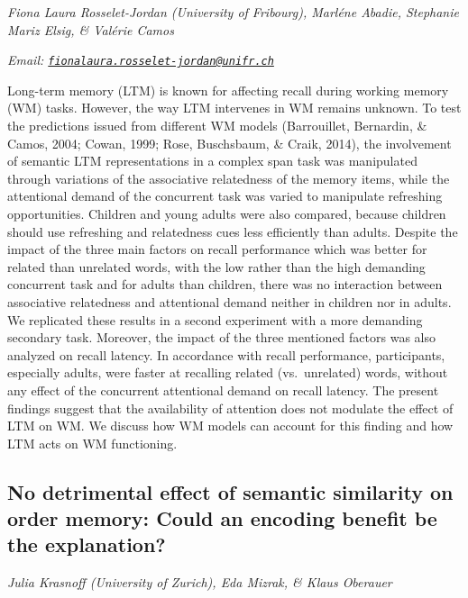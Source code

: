 \documentclass[12pt,]{book}
\begin{document}
\emph{Fiona Laura Rosselet-Jordan (University of Fribourg), Marléne Abadie, Stephanie Mariz Elsig, \& Valérie Camos}

\emph{Email: \href{mailto:fionalaura.rosselet-jordan@unifr.ch}{\nolinkurl{fionalaura.rosselet-jordan@unifr.ch}}}

Long-term memory (LTM) is known for affecting recall during working memory (WM) tasks. However, the way LTM intervenes in WM remains unknown. To test the predictions issued from different WM models (Barrouillet, Bernardin, \& Camos, 2004; Cowan, 1999; Rose, Buschsbaum, \& Craik, 2014), the involvement of semantic LTM representations in a complex span task was manipulated through variations of the associative relatedness of the memory items, while the attentional demand of the concurrent task was varied to manipulate refreshing opportunities. Children and young adults were also compared, because children should use refreshing and relatedness cues less efficiently than adults. Despite the impact of the three main factors on recall performance which was better for related than unrelated words, with the low rather than the high demanding concurrent task and for adults than children, there was no interaction between associative relatedness and attentional demand neither in children nor in adults. We replicated these results in a second experiment with a more demanding secondary task. Moreover, the impact of the three mentioned factors was also analyzed on recall latency. In accordance with recall performance, participants, especially adults, were faster at recalling related (vs.~unrelated) words, without any effect of the concurrent attentional demand on recall latency. The present findings suggest that the availability of attention does not modulate the effect of LTM on WM. We discuss how WM models can account for this finding and how LTM acts on WM functioning.

\hypertarget{no-detrimental-effect-of-semantic-similarity-on-order-memory-could-an-encoding-benefit-be-the-explanation}{%
\subsection{No detrimental effect of semantic similarity on order memory: Could an encoding benefit be the explanation?}\label{no-detrimental-effect-of-semantic-similarity-on-order-memory-could-an-encoding-benefit-be-the-explanation}}

\emph{Julia Krasnoff (University of Zurich), Eda Mizrak, \& Klaus Oberauer}
\end{document}
